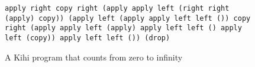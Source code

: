 \begin{figure}[htb]
    \centering
    \begin{lstlisting}
apply right copy right (apply apply left (right right (apply) copy)) (apply left (apply apply left left ()) copy right (apply apply left (apply) apply left left () apply left (copy)) apply left left ()) (drop)
\end{lstlisting}
    \caption{A Kihi program that counts from zero to infinity}
    \label{fig:kihi_example}
\end{figure}
